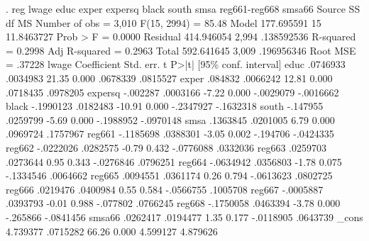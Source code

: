 . reg lwage educ exper expersq black south smsa reg661-reg668 smsa66
{\smallskip}
      Source {\VBAR}       SS           df       MS      Number of obs   =     3,010
   F(15, 2994)     =     85.48
       Model {\VBAR}  177.695591        15  11.8463727   Prob > F        =    0.0000
    Residual {\VBAR}  414.946054     2,994  .138592536   R-squared       =    0.2998
   Adj R-squared   =    0.2963
       Total {\VBAR}  592.641645     3,009  .196956346   Root MSE        =    .37228
{\smallskip}
       lwage {\VBAR} Coefficient  Std. err.      t    P>|t|     [95\% conf. interval]
        educ {\VBAR}   .0746933   .0034983    21.35   0.000     .0678339    .0815527
       exper {\VBAR}    .084832   .0066242    12.81   0.000     .0718435    .0978205
     expersq {\VBAR}   -.002287   .0003166    -7.22   0.000    -.0029079   -.0016662
       black {\VBAR}  -.1990123   .0182483   -10.91   0.000    -.2347927   -.1632318
       south {\VBAR}   -.147955   .0259799    -5.69   0.000    -.1988952   -.0970148
        smsa {\VBAR}   .1363845   .0201005     6.79   0.000     .0969724    .1757967
      reg661 {\VBAR}  -.1185698   .0388301    -3.05   0.002     -.194706   -.0424335
      reg662 {\VBAR}  -.0222026   .0282575    -0.79   0.432    -.0776088    .0332036
      reg663 {\VBAR}   .0259703   .0273644     0.95   0.343    -.0276846    .0796251
      reg664 {\VBAR}  -.0634942   .0356803    -1.78   0.075    -.1334546    .0064662
      reg665 {\VBAR}   .0094551   .0361174     0.26   0.794    -.0613623    .0802725
      reg666 {\VBAR}   .0219476   .0400984     0.55   0.584    -.0566755    .1005708
      reg667 {\VBAR}  -.0005887   .0393793    -0.01   0.988     -.077802    .0766245
      reg668 {\VBAR}  -.1750058   .0463394    -3.78   0.000     -.265866   -.0841456
      smsa66 {\VBAR}   .0262417   .0194477     1.35   0.177    -.0118905    .0643739
       _cons {\VBAR}   4.739377   .0715282    66.26   0.000     4.599127    4.879626
{\smallskip}
